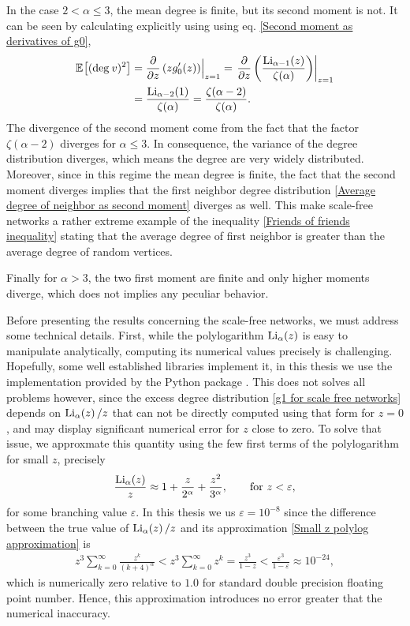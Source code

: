 \documentclass[
11pt, %
english, %
singlespacing, %
nolistspacing, %
liststotoc, %
headsepline, %
]{MastersDoctoralThesis} %
\begin{document}
In the case $2 < \alpha \leq 3$, the mean degree is finite, but its second moment is not. It can be seen by calculating explicitly using using eq. \eqref{Second moment as derivatives of g0},
\begin{align}
	\mathbb{E}_{}\!\left[ (\mathrm{deg}_{}\, v)^2 \right] &= \frac{\partial}{\partial z}\left(z g'_0(z)\right)\Bigr|_{z = 1} = \left. \frac{\partial}{\partial z}\left(\frac{\mathrm{Li}_{\alpha - 1}\!\left(z\right)}{\zeta(\alpha)} \right)\right\rvert_{z = 1} \\
		&= \frac{\mathrm{Li}_{\alpha - 2}\!\left(1\right)}{\zeta(\alpha)} = \frac{\zeta(\alpha - 2)}{\zeta(\alpha)}.
\end{align} 
The divergence of the second moment come from the fact that the factor $\zeta(\alpha - 2)$ diverges for $\alpha \leq 3$. In consequence, the variance of the degree distribution diverges, which means the degree are very widely distributed. Moreover, since in this regime the mean degree is finite, the fact that the second moment diverges implies that the first neighbor degree distribution \eqref{Average degree of neighbor as second moment} diverges as well. This make scale-free networks a rather extreme example of the inequality \eqref{Friends of friends inequality} stating that the average degree of first neighbor is greater than the average degree of random vertices.

Finally for $\alpha > 3$, the two first moment are finite and only higher moments diverge, which does not implies any peculiar behavior.

Before presenting the results concerning the scale-free networks, we must address some technical details. First, while the polylogarithm $\mathrm{Li}_{\alpha}\!\left(z\right)$ is easy to manipulate analytically, computing its numerical values precisely is challenging. Hopefully, some well established libraries implement it, in this thesis we use the implementation provided by the  Python package \cite{mpmath}. This does not solves all problems however, since the excess degree distribution \eqref{g1 for scale free networks} depends on $\mathrm{Li}_{\alpha}\!\left(z\right)/z$ that can not be directly computed using that form for $z = 0$, and may display significant numerical error for $z$ close to zero. To solve that issue, we approxmate this quantity using the few first terms of the polylogarithm for small $z$, precisely
\begin{align}
	\frac{\mathrm{Li}_{\alpha}\!\left(z\right)}{z} \approx 1 + \frac{z}{2^\alpha} + \frac{z^2}{3^\alpha}, \qquad \text{for } z < \varepsilon, \label{Small z polylog approximation}
\end{align}
for some branching value $\varepsilon$. In this thesis we us $\varepsilon = 10^{-8}$ since the difference between the true value of $\mathrm{Li}_{\alpha}\!\left(z\right)/z$ and its approximation \eqref{Small z polylog approximation} is
\begin{align}
	z^3 \sum_{k=0}^\infty \frac{z^k}{(k + 4)^\alpha} < z^3 \sum_{k=0}^\infty z^k = \frac{z^3}{1 - z} < \frac{\varepsilon^3}{1 - \varepsilon} \approx 10^{-24},
\end{align}
which is numerically zero relative to $1.0$ for standard double precision floating point number. Hence, this approximation introduces no error greater that the numerical inaccuracy.
\end{document}
